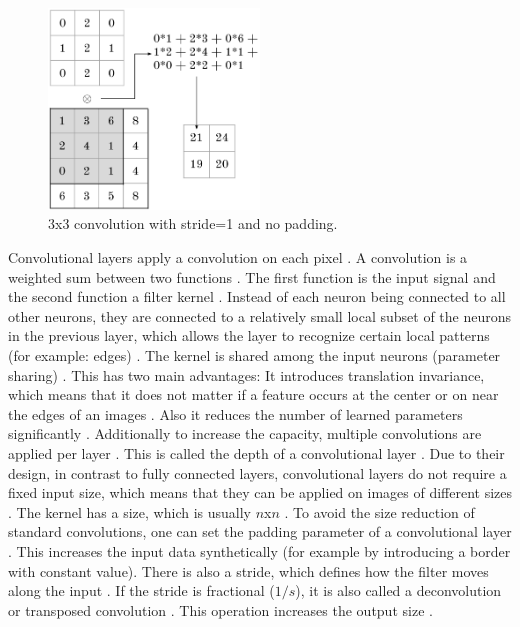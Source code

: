 \documentclass[draft,final,oneside]{vutinfth} %
\begin{document}
\begin{figure}[ht]
	\centering
  	\includegraphics[width=0.5\textwidth]{graphics/convolution.png}
	\caption{3x3 convolution with stride=1 and no padding.}
	\label{fig:convolution}
\end{figure}

Convolutional layers apply a convolution on each pixel \cite{bishop}. A convolution is a weighted sum between two functions \cite{Goodfellow-et-al-2016}. The first function is the input signal and the second function a filter kernel \cite{bishop}. Instead of each neuron being connected to all other neurons, they are connected to a relatively small local subset of the neurons in the previous layer, which allows the layer to recognize certain local patterns (for example: edges) \cite{Goodfellow-et-al-2016}. The kernel is shared among the input neurons (parameter sharing) \cite{bishop}. This has two main advantages: It introduces translation invariance, which means that it does not matter if a feature occurs at the center or on near the edges of an images \cite{Goodfellow-et-al-2016}. Also it reduces the number of learned parameters significantly \cite{bishop}. Additionally to increase the capacity, multiple convolutions are applied per layer \cite{Goodfellow-et-al-2016}. This is called the depth of a convolutional layer \cite{Goodfellow-et-al-2016}. Due to their design, in contrast to fully connected layers, convolutional layers do not require a fixed input size, which means that they can be applied on images of different sizes \cite{dlvc}. The kernel has a size, which is usually $n$x$n$ \cite{alexnet}. To avoid the size reduction of standard convolutions, one can set the padding parameter of a convolutional layer \cite{Goodfellow-et-al-2016}. This increases the input data synthetically (for example by introducing a border with constant value). There is also a stride, which defines how the filter moves along the input \cite{Goodfellow-et-al-2016}. If the stride is fractional ($1/s$), it is also called a deconvolution or transposed convolution \cite{dlvc}. This operation increases the output size \cite{Goodfellow-et-al-2016}.
\end{document}
